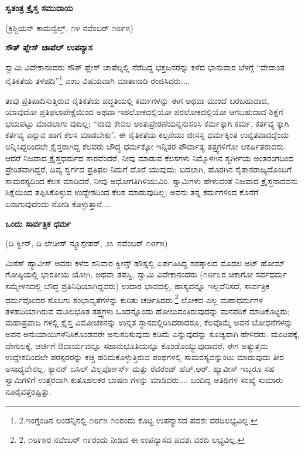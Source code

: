 \begin{center}
\textbf{ಸ್ವತಂತ್ರ ಕ್ರೈಸ್ತ ಸಮುದಾಯ}
\end{center}

\begin{center}
(ಕ್ರಿಶ್ಚಿಯನ್ ಕಾಮನ್ವೆಲ್ತ್, ೧೪ ನವೆಂಬರ್ ೧೮೯೫)
\end{center}

\begin{center}
\textbf{ಸೌತ್ ಪ್ಲೇಸ್ ಚಾಪೆಲ್ ಉಪನ್ಯಾಸ}
\end{center}

ಸ್ವಾಮಿ ವಿವೇಕಾನಂದರು ಸೌತ್ ಪ್ಲೇಸ್ ಚಾಪೆಲ್ನಲ್ಲಿ ನೆರೆದಿದ್ದ ಭಕ್ತಜನರನ್ನು ಕಳೆದ ಭಾನುವಾರ ಬೆಳಗ್ಗೆ “ವೇದಾಂತ ನೈತಿಕತೆಯ ತಳಹದಿ”\footnote{2.ಇಂಗ್ಲೆಂಡಿನ ಲಂಡನ್ನಿನಲ್ಲಿ ೧೮೯೫ ೧೦ರಂದು ಕೊಟ್ಟ ಉಪನ್ಯಾಸದ ಪದಶಃ ವರದಿಲಭ್ಯವಿಲ್ಲ.} ಎಂಬ ವಿಷಯವಾಗಿ ಮಾತಾನಾಡಿ ರಂಜಿಸಿದರು....

ತಾವು ಪ್ರತಿಪಾದಿಸುತ್ತಿರುವ ನೈತಿಕತೆಯ ಪದ್ಧತಿಯಲ್ಲಿ ಕರ್ಮಗಳನ್ನು ಈಗ ಅಥವಾ ಮುಂದೆ ಬರಬಹುದಾದ, ಯಾವುದೋ ಪ್ರತಿಫಲಾಪೇಕ್ಷೆಯಿಂದ ಅಥವಾ ಇಹಲೋಕದಲ್ಲಿಯೋ ಪರಲೋಕದಲ್ಲಿಯೋ ಆಗಬಹುದಾದ ಶಿಕ್ಷೆಗೆ ಭಯಪಟ್ಟು ಮಾಡಲಾಗು ವುದಿಲ್ಲ; “ನಾವು ಕೇವಲ ಅಂತಃಪ್ರೇರಣೆಯನ್ನನುಸರಿಸಿ ಕರ್ಮಕ್ಕಾಗಿ ಕರ್ಮ, ಕರ್ತವ್ಯ ಕ್ಕಾಗಿ ಕರ್ತವ್ಯ ಎನ್ನುವ ಹಾಗೆ ಕೆಲಸ ಮಾಡಬೇಕು”. ಈ ನೈತಿಕತೆಯ ಕಲ್ಪನೆಯು ಜೀಸಸ್ನ ಧರ್ಮಕ್ಕಿಂತ ಉನ್ನತವಾದದ್ದೆಂದು ಅನ್ನಿಸಿದ್ದರಿಂದಲೇ ಕ್ರೈಸ್ತರಾಗಿದ್ದ ಕೆಲವರು ಬೌದ್ಧ ಧರ್ಮಕ್ಕೋ ಇನ್ನಿತರ ಪೌರ್ವಾತ್ಯ ತತ್ತ್ವಗಳಿಗೋ ಆಕರ್ಷಿತರಾದರು. ಆದರೆ ನಿಜವಾದ ಕ್ರೈಸ್ತಧರ್ಮದ ಸಾರವೆಂದರೆ, ನೀವು ಮಾಡುವ ಕೆಲಸಗಳು ನಿಮ್ಮೊಳಗಿನ ಸ್ವರ್ಗೀಯ ಅಂತರಂಗದಿಂದ ಪ್ರೇರಿತವಾಗಿದ್ದರೆ, ದಿವ್ಯ ಸ್ವರ್ಗದ ಪ್ರತಿಫಲ ನಿಮಗೆ ದೊರೆ ಯುವುದು; ಬದಲಾಗಿ, ಹೊರಗಿನ ಸೈತಾನರಾಜ್ಯದೊಂದಿಗೆ ಸಾಮರಸ್ಯದಿಂದ ಕೆಲಸ ಮಾಡಿದರೆ, ನೀವು ಅಧೋಗತಿಗಿಳಿಯುವಿರಿ. ಸ್ವಾಮಿಗಳು ಹೇಳುವಂತೆ ನಿಜವಾದ ಕ್ರೈಸ್ತನಾದವನು ಶಿಕ್ಷೆಯಿಂದ ತಪ್ಪಿಸಿಕೊಳ್ಳುವ ಉದ್ದೇಶದಿಂದ ಕೆಲಸ ಮಾಡುವುದಿಲ್ಲ; ಅವನು ತನ್ನ ಕರ್ಮಗಳಿಂದ ಕೊನೆಗೆ ಏನಾಗುವುದೆಂದು ನೋಡಿ ಕೊಳ್ಳುತ್ತಾನೆ....

\begin{center}
\textbf{ಒಂದು ಸಾರ್ವತ್ರಿಕ ಧರ್ಮ}
\end{center}

\begin{center}
(ದಿ ಕ್ವೀನ್, ದಿ ಲೇಡೀಸ್ ನ್ಯೂಸ್ಪೇಪರ್, ೨೩ ನವೆಂಬರ್ ೧೮೯೫)
\end{center}

ಮಿಸೆಸ್ ಹ್ಯಾವೀಸ್ ಅವರು ಕಳೆದ ಶನಿವಾರ ಕ್ವೀನ್ಸ್ ಹೌಸ್ನಲ್ಲಿ ಏರ್ಪಡಿಸಿದ್ದ ಶರತ್ಕಾಲದ ಮೊದಲ ಅಟ್ ಹೋಮ್​ ಗೋಷ್ಠಿಯಲ್ಲಿ ಭಾರತೀಯ ಯೋಗಿ, ಅಥವಾ ತಪಸ್ವಿ, ಸ್ವಾಮಿ ವಿವೇಕಾನಂದರು (೧೮೯೩ರ ಚಿಕಾಗೋ ಸರ್ವಧರ್ಮ ಸಮ್ಮೇಳನದಲ್ಲಿ ಬೌದ್ಧ ಪ್ರತಿನಿಧಿಯಾಗಿದ್ದವರು) ಉದಾರ ಭಾವದಲ್ಲಿ, ಹಾಸ್ಯವನ್ನೂ ಇಲ್ಲವೆನಿಸದೆ, ಸಾರ್ವತ್ರಿಕ ಧರ್ಮವೊಂದರ ಸೊಬಗು ಸಂಭಾವ್ಯತೆಗಳನ್ನು ಕುರಿತು ಚರ್ಚಿಸಿದರು.\footnote{2. ೧೮೯೫ರ ನವೆಂಬರ್ ೧೯ರಂದು ನೀಡಿದ ಈ ಉಪನ್ಯಾಸದ ಪದಶಃ ವರದಿ ಲಭ್ಯವಿಲ್ಲ.} ಲೋಕದ ಎಲ್ಲ ಮಹಾಧರ್ಮಗಳ ತಳಹದಿಯಾಗಿರುವ ಮೂಲಭೂತ ತತ್ತ್ವಗಳು ಒಂದನ್ನೊಂದು ಹೋಲುವಂತಿರುವುದನ್ನು ಮನವರಿಕೆ ಮಾಡಿಕೊಟ್ಟರು; ಮಹಾಪ್ರವಾದಿ ಗಳಲ್ಲಿ ಕ್ರೈಸ್ತ ವಿಮೋಚಕನನ್ನು ಉನ್ನತ ಸ್ಥಾನದಲ್ಲಿರಿಸಿದರಾದರೂ, ಕೆಲವೊಮ್ಮೆ ಅವನ ಬೋಧನೆಗಳನ್ನು ಅವನ ಅನುಯಾಯಿಗಳೆನಿಸಿಕೊಂಡವರೇ ಅನುಸರಿಸುವುದು ಕಡಿಮೆ ಎನ್ನುವುದನ್ನು ಸೂಚ್ಯವಾಗಿ ಹೇಳಿದರು. ಮಂಟಪಕ್ಕೆ, ದೇಗುಲಕ್ಕೆ, ಚರ್ಚಿಗೆ ಔದಾರ್ಯವನ್ನೂ ಸಹಾನುಭೂತಿಯನ್ನೂ ಕೊಂಡೊಯ್ಯುವುದಾದರೆ, ಈಗ ಅತ್ಯುತ್ತಮ ಉದ್ದೇಶದಿಂದಲೇ ಪರಸ್ಪರರನ್ನು ಕಚ್ಚಿ ಹರಿದುಕೊಳ್ಳುತ್ತಿರುವ ಪಂಥಗಳಲ್ಲಿ ಸಾಮರಸ್ಯವನ್ನುಂಟು ಮಾಡುವುದು ತೀರ ಅಸಾಧ್ಯವೇನಲ್ಲ. ಕ್ಯಾನನ್ ಬಸಿಲ್ ವಿಲ್ಬರ್ಫೋರ್ಸ್ ಮತ್ತು ರೆವರೆಂಡ್ ಹೆಚ್.ಆರ್. ಹ್ಯಾವೀಸ್ ಇಬ್ಬರೂ ಸಹ ಸ್ವಾಮಿಗಳಿಗೆ ಉತ್ತರವಾಗಿ ಕುತೂಹಲಕರ ಭಾಷಣ ಗಳನ್ನು ಮಾಡಿದರು.... ಬಂದಿದ್ದ ಅತಿಥಿಗಳ ಸಂಖ್ಯೆ ಸುಮಾರು ನೂರೈವತ್ತರಷ್ಟಿತ್ತು.

